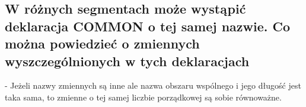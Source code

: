 \subsection{W różnych segmentach może wystąpić deklaracja COMMON o tej samej nazwie. Co można powiedzieć o zmiennych wyszczególnionych w tych deklaracjach}
- Jeżeli nazwy zmiennych są inne ale nazwa obszaru wspólnego i jego długość jest taka sama, to zmienne o tej samej liczbie porządkowej są sobie równoważne.